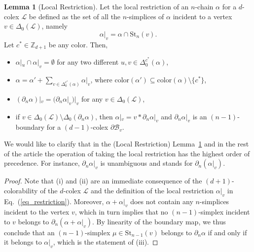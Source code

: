 \documentclass[onecolumn,letterpaper,11pt,accepted=2022-12-19]{quantumarticle}
\newcommand{\face}[2]{{\Delta_{#1}(#2)}}
\newcommand{\facex}[3]{{\Delta^{#1}_{#2}(#3)}}
\renewcommand{\star}[2]{{\mathrm{St}_{#1}(#2)}}
\newcommand{\rest}[1]{|_{#1}}
\newcommand{\col}[1]{{\mathrm{color}(#1)}}
\theoremstyle{definition}
\newtheorem{lemma}{Lemma}
\theoremstyle{lemma}
\theoremstyle{theorem}
\theoremstyle{corollary}
\begin{document}
{\begin{lemma}[Local Restriction]
\label{lemma_rest}
Let the local restriction of an $n$-chain $\alpha$ for a $d$-colex $\mathcal{L}$ be defined as the set of all the $n$-simplices of $\alpha$ incident to a vertex $v\in\face 0 {\mathcal{L}}$, namely
\begin{equation}
\label{eq_restriction}
\alpha\rest v = \alpha \cap \star n v.
\end{equation}
Let $c^*\in\mathbb{Z}_{d+1}$ be any color.
Then,
\begin{itemize}
\item[(i)] $\alpha\rest u \cap \alpha\rest v = \emptyset$ for any two different $u,v\in \facex {c^*} 0 \alpha$,
\item[(ii)] $\alpha = \alpha' + \sum_{v\in \facex {c^*} 0 \alpha} \alpha\rest v$, where $\col{\alpha'}\subseteq \col\alpha \setminus \{ c^*\}$,
\item[(iii)] $(\partial_n\alpha)\rest v = (\partial_n \alpha\rest v)\rest v$ for any $v\in\face 0 {\mathcal{L}}$,
\item[(iv)] if $v \in\face 0 {\mathcal{L}}\setminus\face 0 {\partial_n\alpha}$, then $\alpha\rest v = v* \partial_n \alpha\rest v$ and $\partial_n \alpha\rest v$ is an $(n-1)$-boundary for a $(d-1)$-colex $\partial\mathcal{B}_v$.
\end{itemize}
\end{lemma}

We would like to clarify that in the (Local Restriction) Lemma~\ref{lemma_rest} and in the rest of the article the operation of taking the local restriction has the highest order of precedence.
For instance, $\partial_n \alpha\rest v$ is unambiguous and stands for $\partial_n (\alpha\rest v)$.

\begin{proof}
Note that (i) and (ii) are an immediate consequence of the $(d+1)$-colorability of the $d$-colex $\mathcal{L}$ and the definition of the local restriction $\alpha\rest v$ in Eq.~(\ref{eq_restriction}).
Moreover, $\alpha + \alpha\rest v$ does not contain any $n$-simplices incident to the vertex $v$, which in turn implies that no $(n-1)$-simplex incident to $v$ belongs to ${\partial_n(\alpha + \alpha\rest v)}$.
By linearity of the boundary map, we thus conclude that an $(n-1)$-simplex $\mu\in\star {n-1} v$ belongs to $\partial_n \alpha$ if and only if it belongs to $\alpha\rest v$, which is the statement of (iii).



\end{proof}}
\end{document}
